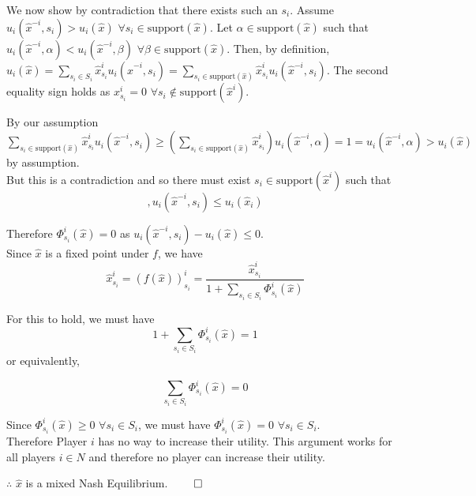 \documentclass[12pt]{article}
\begin{document}
We now show by contradiction that there exists such an $s_i$. Assume $u_i(\hat{x}^{-i}, s_i) > u_i(\hat{x})$ $\forall s_i \in \text{support}(\hat{x})$. Let $\alpha \in \text{support}(\hat{x})$ such that $u_i(\hat{x}^{-i}, \alpha) < u_i(\hat{x}^{-i}, \beta)$ $\forall \beta \in \text{support}(\hat{x})$. Then, by definition, $u_i(\hat{x}) = \sum\limits_{s_i \in S_i} \hat{x}^i_{s_i} u_i(\hat{x}^{-i},s_i) = \sum\limits_{s_i \in \text{support}(\hat{x})} \hat{x}^i_{s_i} u_i(\hat{x}^{-i},s_i)$. The second equality sign holds as $x^i_{s_i} = 0$ $\forall  s_i \notin \text{support}(\hat{x}^i)$.

By our assumption $\sum\limits_{s_i \in \text{support}(\hat{x})} \hat{x}^i_{s_i} u_i(\hat{x}^{-i},s_i) \geq (\sum\limits_{s_i \in \text{support}(\hat{x})} \hat{x}^i_{s_i})u_i(\hat{x}^{-i}, \alpha) = 1 = u_i(\hat{x}^{-i}, \alpha) > u_i(\hat{x})$ by assumption.\\

But this is a contradiction and so there must exist $s_i \in \text{support}(\hat{x}^i)$ such that 
\begin{equation*},
u_i(\hat{x}^{-i},s_i) \leq u_i(\hat{x}_i)
\end{equation*}

Therefore $\Phi^i_{s_i}(\hat{x}) = 0$ as $u_i(\hat{x}^{-i},s_i) - u_i(\hat{x}) \leq 0$.\\

Since $\hat{x}$ is a fixed point under $f$, we have 
\begin{equation*}
\hat{x}^i_{s_i} = (f(\hat{x}))^i_{s_i} = \dfrac{\hat{x}^i_{s_i}}{1 + \sum\limits_{s_i \in S_i} \Phi^i_{s_i}(\hat{x})}
\end{equation*}
 
For this to hold, we must have
\begin{equation*}
1 + \sum\limits_{s_i \in S_i} \Phi^i_{s_i}(\hat{x}) = 1
\end{equation*}
or equivalently,

\begin{equation*}
\sum\limits_{s_i \in S_i} \Phi^i_{s_i}(\hat{x}) = 0
\end{equation*}

Since $\Phi^i_{s_i}(\hat{x}) \geq 0$ $\forall s_i \in S_i$, we must have $\Phi^i_{s_i}(\hat{x}) = 0$ $\forall s_i \in S_i$.\\

Therefore Player $i$ has no way to increase their utility. This argument works for all players $i \in N$ and therefore no player can increase their utility.

$\therefore$ $\hat{x}$ is a mixed Nash Equilibrium.
$\qed$
\end{document}
